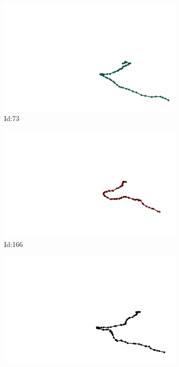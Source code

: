 \documentclass[12pt,twoside]{report}
\begin{document}
\begin{figure}
\centering
\begin{subfigure}[b]{0.20\textwidth}
\centering
\includegraphics[width=\textwidth]{../../trajectories/73.png}
\caption{Id:73}
\end{subfigure}
\begin{subfigure}[b]{0.20\textwidth}
\centering
\includegraphics[width=\textwidth]{../../trajectories/166.png}
\caption{Id:166}
\end{subfigure}
\begin{subfigure}[b]{0.20\textwidth}
\centering
\includegraphics[width=\textwidth]{../../trajectories/287.png}

\end{subfigure}
\end{figure}
\end{document}
